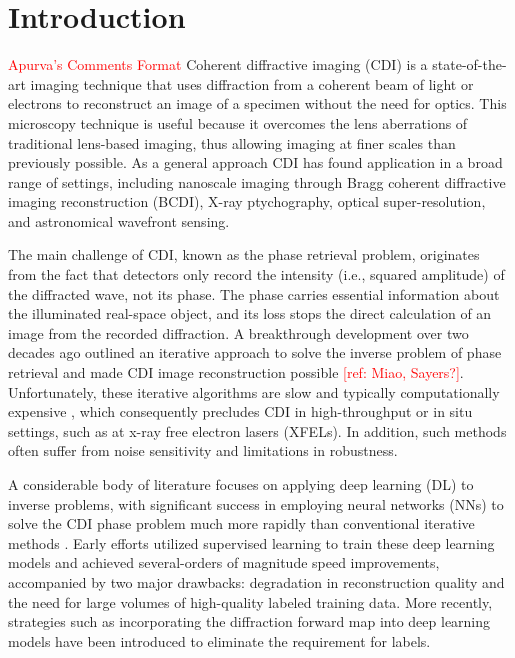 \documentclass[sn-mathphys]{sn-jnl}%
\theoremstyle{thmstyleone}%
\theoremstyle{thmstyletwo}%
\theoremstyle{thmstylethree}%
\begin{document}
\section{Introduction }\label{sec1}
\textcolor{red}{Apurva's Comments Format}
Coherent diffractive imaging (CDI) is a state-of-the-art imaging technique that uses diffraction from a coherent beam of light or electrons to reconstruct an image of a specimen without the need for optics. This microscopy technique is useful because it overcomes the lens aberrations of traditional lens-based imaging, thus allowing imaging at finer scales than previously possible. As a general approach CDI has found application in a broad range of settings, including nanoscale imaging through Bragg coherent diffractive imaging reconstruction (BCDI), X-ray ptychography, optical super-resolution, and astronomical wavefront sensing. \cite{dean2006phase, heintzmann2021answers, miao2015beyond}

The main challenge of CDI, known as the phase retrieval problem, originates from the fact that detectors only record the intensity (i.e., squared amplitude) of the diffracted wave, not its phase. The phase carries essential information about the illuminated real-space object, and its loss stops the direct calculation of an image from the recorded diffraction. A breakthrough development over two decades ago outlined an iterative approach to solve the inverse problem of phase retrieval and made CDI image reconstruction possible \textcolor{red}{[ref: Miao, Sayers?]}. Unfortunately, these iterative algorithms are slow and typically computationally expensive \cite{epie}, which consequently precludes CDI in high-throughput or in situ settings, such as at x-ray free electron lasers (XFELs). In addition, such methods often suffer from noise sensitivity and limitations in robustness.

A considerable body of literature focuses on applying deep learning (DL) to inverse problems, with significant success in employing neural networks (NNs) to solve the CDI phase problem much more rapidly than conventional iterative methods \cite{ratner2021recovering,yao2022autophasenn}. Early efforts utilized supervised learning to train these deep learning models and achieved several-orders of magnitude speed improvements, accompanied by two major drawbacks: degradation in reconstruction quality and the need for large volumes of high-quality labeled training data. More recently, strategies such as incorporating the diffraction forward map into deep learning models have been introduced to eliminate the requirement for labels. 
\end{document}
